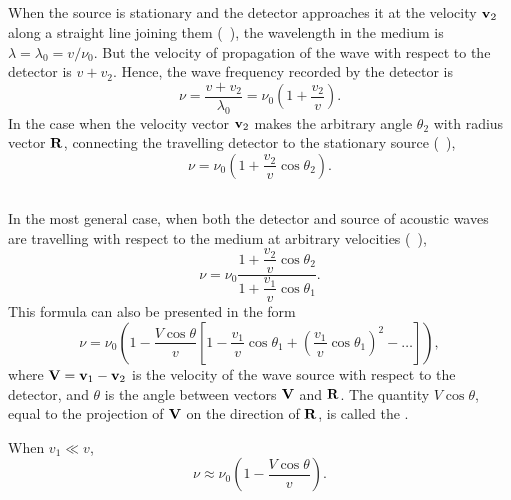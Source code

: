\subsection{}\label{30.6.2} When the source is stationary and the detector approaches it at the velocity $\vb{v}_{2}$ along a straight line joining them (~), the wavelength in the medium is $\lambda = \lambda_{0} = v/\nu_{0}$. But the velocity of propagation of the wave with respect to the detector is $v + v_{2}$. Hence, the wave frequency recorded by the detector is
\begin{equation*}%
\nu = \frac{v + v_{2}} {\lambda_{0}} = \nu_{0} \left( 1 + \frac{v_{2}}{v}\right).
\end{equation*}
In the case when the velocity vector $\vb{v}_{2}$ makes the arbitrary angle $\theta_{2}$ with radius vector $\vb{R}$, connecting the travelling detector to the stationary source (~),
\begin{equation*}%
\nu = \nu_{0} \left( 1 + \frac{v_{2}}{v} \cos \theta_{2} \right).
\end{equation*}

\subsection{}\label{30.6.3} In the most general case, when both the detector and source of acoustic waves are travelling with respect to the medium at arbitrary velocities (~),
\begin{equation*}%
\nu = \nu_{0} \frac{1 + \dfrac{v_{2}}{v} \cos \theta_{2}}{1 + \dfrac{v_{1}}{v} \cos \theta_{1}}.
\end{equation*}
This formula can also be presented in the form
\begin{equation*}
\nu = \nu_{0} \left( 1 - \frac{V \cos \theta}{v} \left[ 1 - \frac{v_{1}}{v} \cos \theta_{1} + \left( \frac{v_{1}}{v} \cos \theta_{1} \right)^{2} - \ldots \right] \right),
\end{equation*}
where $\vb{V} = \vb{v}_{1} - \vb{v}_{2}$ is the velocity of the wave source with respect to the detector, and $\theta$ is the angle between vectors $\vb{V}$ and $\vb{R}$. The quantity $V \cos \theta$, equal to the projection of $\vb{V}$ on the direction of $\vb{R}$, is called the .

When $v_{1} \ll v$,
\begin{equation*}%
\nu \approx \nu_{0} \left(1 - \frac{V \cos \theta}{v} \right).
\end{equation*}
